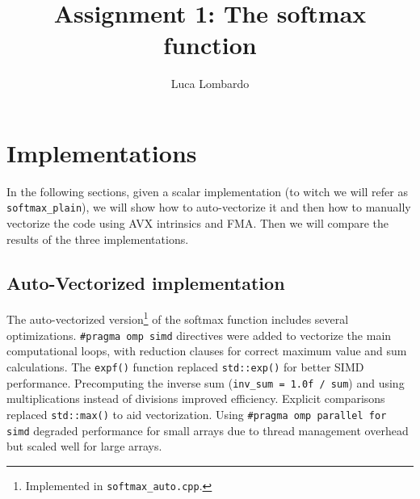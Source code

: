 \documentclass[10pt]{article}
\title{Assignment 1: The softmax function}
\author{Luca Lombardo}
\date{}
\newcommand{\R}{\mathbb{R}}
\begin{document}
\maketitle


\setlength{\parindent}{0em}



\section{Implementations}
In the following sections, given a scalar implementation (to witch we will refer as \texttt{softmax\_plain}), we will show how to auto-vectorize it and then how to manually vectorize the code using AVX intrinsics and FMA. Then we will compare the results of the three implementations.

\subsection{Auto-Vectorized implementation}
The auto-vectorized version\footnote{Implemented in \texttt{softmax\_auto.cpp}.} of the softmax function includes several optimizations. \texttt{\#pragma omp simd} directives were added to vectorize the main computational loops, with reduction clauses for correct maximum value and sum calculations. The \texttt{expf()} function replaced \texttt{std::exp()} for better SIMD performance. Precomputing the inverse sum (\texttt{inv\_sum = 1.0f / sum}) and using multiplications instead of divisions improved efficiency. Explicit comparisons replaced \texttt{std::max()} to aid vectorization. Using \texttt{\#pragma omp parallel for simd} degraded performance for small arrays due to thread management overhead but scaled well for large arrays.
\end{document}
